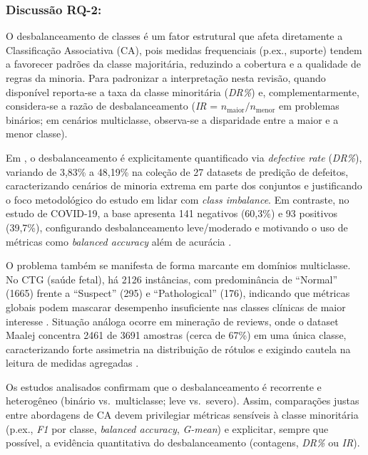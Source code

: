 \subsubsection{Discussão RQ-2:}
O desbalanceamento de classes é um fator estrutural que afeta diretamente a Classificação Associativa (CA), pois medidas frequenciais (p.ex., suporte) tendem a favorecer padrões da classe majoritária, reduzindo a cobertura e a qualidade de regras da minoria. Para padronizar a interpretação nesta revisão, quando disponível reporta-se a taxa da classe minoritária (\textit{DR\%}) e, complementarmente, considera-se a razão de desbalanceamento (\textit{IR} = $n_{\text{maior}}/n_{\text{menor}}$ em problemas binários; em cenários multiclasse, observa-se a disparidade entre a maior e a menor classe).

Em \cite{wu2024novel}, o desbalanceamento é explicitamente quantificado via \textit{defective rate} (\textit{DR\%}), variando de 3,83\% a 48,19\% na coleção de 27 datasets de predição de defeitos, caracterizando cenários de minoria extrema em parte dos conjuntos e justificando o foco metodológico do estudo em lidar com \textit{class imbalance}. 
Em contraste, no estudo de COVID-19, a base apresenta 141 negativos (60,3\%) e 93 positivos (39,7\%), configurando desbalanceamento leve/moderado e motivando o uso de métricas como \textit{balanced accuracy} além de acurácia \cite{cicek2021assessment}.

O problema também se manifesta de forma marcante em domínios multiclasse. No CTG (saúde fetal), há 2126 instâncias, com predominância de ``Normal'' (1665) frente a ``Suspect'' (295) e ``Pathological'' (176), indicando que métricas globais podem mascarar desempenho insuficiente nas classes clínicas de maior interesse \cite{piri2019exploring}. Situação análoga ocorre em mineração de reviews, onde o dataset Maalej concentra 2461 de 3691 amostras (cerca de 67\%) em uma única classe, caracterizando forte assimetria na distribuição de rótulos e exigindo cautela na leitura de medidas agregadas \cite{alhawari2021classification}.

Os estudos analisados confirmam que o desbalanceamento é recorrente e heterogêneo (binário vs.\ multiclasse; leve vs.\ severo). Assim, comparações justas entre abordagens de CA devem privilegiar métricas sensíveis à classe minoritária (p.ex., \textit{F1} por classe, \textit{balanced accuracy}, \textit{G-mean}) e explicitar, sempre que possível, a evidência quantitativa do desbalanceamento (contagens, \textit{DR\%} ou \textit{IR}).
